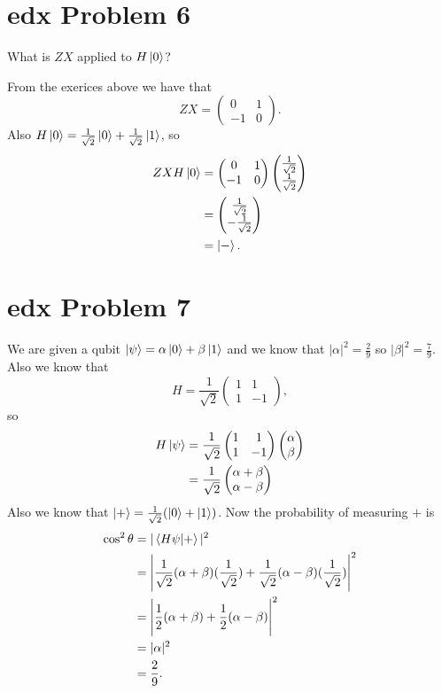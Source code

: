 \documentclass[10pt]{article}
\begin{document}
\section*{edx Problem 6}
What is $ZX$ applied to $H\ket{0}$?

From the exerices above we have that
\[
ZX = \begin{pmatrix}
0 & 1 \\
-1 & 0
\end{pmatrix}.
\]
Also $H\ket{0} = \frac{1}{\sqrt{2}} \ket{0} + \frac{1}{\sqrt{2}} \ket{1}$, so
\begin{align*}
ZXH\ket{0} &= \begin{pmatrix}
0 & 1 \\
-1 & 0
\end{pmatrix}
\begin{pmatrix}
\frac{1}{\sqrt{2}} \\
\frac{1}{\sqrt{2}} 
\end{pmatrix} \\
&= \begin{pmatrix}
\frac{1}{\sqrt{2}} \\
-\frac{1}{\sqrt{2}}
\end{pmatrix} \\
&= \ket{-}.
\end{align*}

\section*{edx Problem 7}
We are given a qubit $\ket{\psi} = \alpha \ket{0} + \beta \ket{1}$ and we know that $|\alpha|^2 = \frac{2}{9}$ so $|\beta|^2 = \frac{7}{9}$. Also we know that
\[
H = \frac{1}{\sqrt{2}} \begin{pmatrix}
1 & 1 \\
1 & -1
\end{pmatrix},
\]
so 
\begin{align*}
H\ket{\psi} &= \frac{1}{\sqrt{2}} \begin{pmatrix}
1 & 1 \\
1 & -1
\end{pmatrix} \begin{pmatrix}
\alpha \\
\beta
\end{pmatrix} \\
&= \frac{1}{\sqrt{2}} \begin{pmatrix}
\alpha + \beta \\
\alpha - \beta
\end{pmatrix}
\end{align*}
Also we know that $\ket{+} = \frac{1}{\sqrt{2}} (\ket{0} + \ket{1})$. Now the probability of measuring $+$ is 
\begin{align*}
\cos^2 \theta &= |\braket{H\psi | +}|^2 \\
					   &= \Bigg|\frac{1}{\sqrt{2}}(\alpha + \beta)(\frac{1}{\sqrt{2}}) + \frac{1}{\sqrt{2}}(\alpha - \beta)(\frac{1}{\sqrt{2}}) \Bigg|^2 \\
					   &= \Bigg| \frac{1}{2} (\alpha + \beta) + \frac{1}{2} (\alpha - \beta) \Bigg|^2 \\
					   &= | \alpha |^2 \\
					   &= \frac{2}{9}.
\end{align*}
\end{document}
